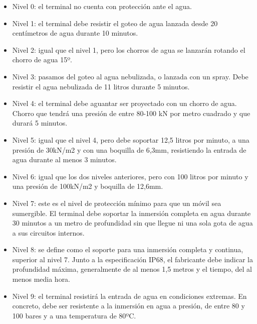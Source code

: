 \begin{itemize}
	\item Nivel 0: el terminal no cuenta con protección ante el agua.
	\item Nivel 1: el terminal debe resistir el goteo de agua lanzada desde 
		20 centímetros de agua durante 10 minutos.
	\item Nivel 2: igual que el nivel 1, pero los chorros de agua se 
		lanzarán rotando el chorro de agua 15º.
	\item Nivel 3: pasamos del goteo al agua nebulizada, o lanzada con un 
		spray. Debe resistir el agua nebulizada de 11 litros durante 5 
		minutos.
	\item Nivel 4: el terminal debe aguantar ser proyectado con un chorro de 
		agua. Chorro que tendrá una presión de entre 80-100 kN por metro 
		cuadrado y que durará 5 minutos.
	\item Nivel 5: igual que el nivel 4, pero debe soportar 12,5 litros por 
		minuto, a una presión de 30kN/m2 y con una boquilla de 6,3mm, 
		resistiendo la entrada de agua durante al menos 3 minutos.
	\item Nivel 6: igual que los dos niveles anteriores, pero con 100 litros 
		por minuto y una presión de 100kN/m2 y boquilla de 12,6mm.
	\item Nivel 7: este es el nivel de protección mínimo para que un móvil 
		sea sumergible. El terminal debe soportar la inmersión completa 
		en agua durante 30 minutos a un metro de profundidad sin que 
		llegue ni una sola gota de agua a sus circuitos internos.
	\item Nivel 8: se define como el soporte para una inmersión completa y 
		continua, superior al nivel 7. Junto a la especificación IP68, 
		el fabricante debe indicar la profundidad máxima, generalmente 
		de al menos 1,5 metros y el tiempo, del al menos media hora.
	\item Nivel 9: el terminal resistirá la entrada de agua en condiciones 
		extremas. En concreto, debe ser resistente a la inmersión en 
		agua a presión, de entre 80 y 100 bares y a una temperatura de 
		80ºC.
\end{itemize}
